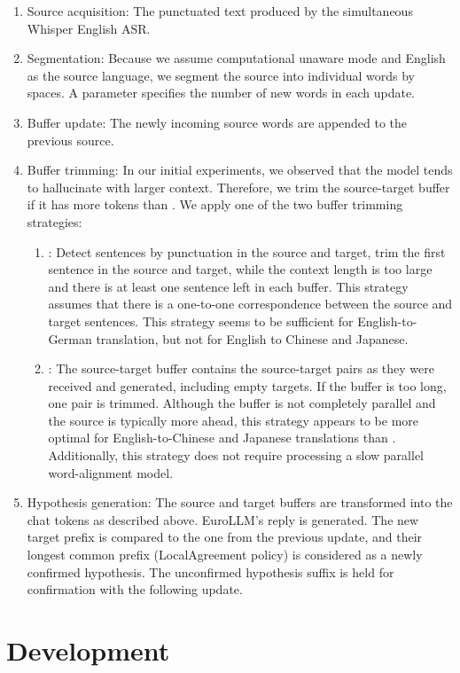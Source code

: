 \documentclass[11pt]{article}
\begin{document}
\begin{enumerate}
    \item Source acquisition: The punctuated text produced by the simultaneous Whisper English ASR.
    \item Segmentation: Because we assume computational unaware mode and English as the source language, we segment the source into individual words by spaces. A parameter \MinChunkSize{} specifies the number of new words in each update.
    \item Buffer update: The newly incoming source words are appended to the previous source.
    \item Buffer trimming: In our initial experiments, we observed that the model tends to hallucinate with larger context. Therefore, we trim the source-target buffer if it has more tokens than \MaxContextLen{}. We apply one of the two buffer trimming strategies:
    \begin{enumerate}
        \item \Sentences: Detect sentences by punctuation in the source and target, trim the first sentence in the source and target, while the context length is too large and there is at least one sentence left in each buffer. This strategy assumes that there is a one-to-one correspondence between the source and target sentences. This strategy seems to be sufficient for English-to-German translation, but not for English to Chinese and Japanese.
        \item \Segments: The source-target buffer contains the source-target pairs as they were received and generated, including empty targets. If the buffer is too long, one pair is trimmed. Although the buffer is not completely parallel and the source is typically more ahead, this strategy appears to be more optimal for English-to-Chinese and Japanese translations than \Sentences{}. Additionally, this strategy does not require processing a slow parallel word-alignment model.
    \end{enumerate}
    \item Hypothesis generation: The source and target buffers are transformed into the chat tokens as described above. EuroLLM's reply is generated. The new target prefix is compared to the one from the previous update, and their longest common prefix (LocalAgreement policy) is considered as a newly confirmed hypothesis. The unconfirmed hypothesis suffix is held for confirmation with the following update.
\end{enumerate}

\section{Development}
\end{document}
